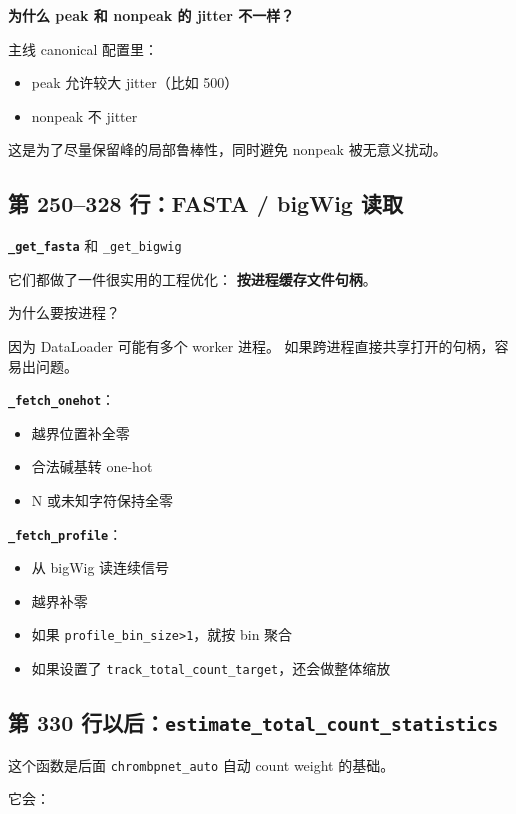 \documentclass[11pt,a4paper]{ctexart}
\begin{document}
\textbf{为什么 peak 和 nonpeak 的 jitter 不一样？}

主线 canonical 配置里：

\begin{itemize}[leftmargin=2em]
\item peak 允许较大 jitter（比如 500）
\item nonpeak 不 jitter
\end{itemize}

这是为了尽量保留峰的局部鲁棒性，同时避免 nonpeak 被无意义扰动。

\subsection{第 250--328 行：FASTA / bigWig 读取}

\textbf{\texttt{\_get\_fasta}} 和 \texttt{\_get\_bigwig}

它们都做了一件很实用的工程优化：
\textbf{按进程缓存文件句柄}。

为什么要按进程？

因为 DataLoader 可能有多个 worker 进程。
如果跨进程直接共享打开的句柄，容易出问题。

\textbf{\texttt{\_fetch\_onehot}}：

\begin{itemize}[leftmargin=2em]
\item 越界位置补全零
\item 合法碱基转 one-hot
\item N 或未知字符保持全零
\end{itemize}

\textbf{\texttt{\_fetch\_profile}}：

\begin{itemize}[leftmargin=2em]
\item 从 bigWig 读连续信号
\item 越界补零
\item 如果 \texttt{profile\_bin\_size>1}，就按 bin 聚合
\item 如果设置了 \texttt{track\_total\_count\_target}，还会做整体缩放
\end{itemize}

\subsection{第 330 行以后：\texttt{estimate\_total\_count\_statistics}}

这个函数是后面 \texttt{chrombpnet\_auto} 自动 count weight 的基础。

它会：
\end{document}
